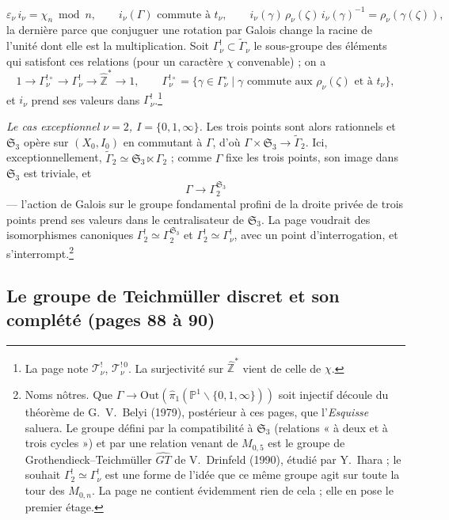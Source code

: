 \documentclass[11pt,a4paper]{article}
\begin{document}
\[
\varepsilon_{\nu}\, i_{\nu} = \chi_{n} \bmod n, \qquad
i_{\nu}(\Gamma) \text{ commute à } t_{\nu}, \qquad
i_{\nu}(\gamma)\, \rho_{\nu}(\zeta)\, i_{\nu}(\gamma)^{-1} =
\rho_{\nu}(\gamma(\zeta)) ,
\]
la dernière parce que conjuguer une rotation par Galois change la racine de
l'unité dont elle est la multiplication. Soit $\Gamma^{!}_{\nu} \subset
\widetilde{\Gamma}_{\nu}$ le sous-groupe des éléments qui satisfont ces
relations (pour un caractère $\chi$ convenable) ; on a
\[
1 \to \Gamma^{!\circ}_{\nu} \to \Gamma^{!}_{\nu} \to \widehat{\mathbb{Z}}^{*} \to 1,
\qquad
\Gamma^{!\circ}_{\nu} = \{\gamma \in \Gamma^{\circ}_{\nu} \mid \gamma \text{ commute
aux } \rho_{\nu}(\zeta) \text{ et à } t_{\nu}\},
\]
et $i_{\nu}$ prend ses valeurs dans $\Gamma^{!}_{\nu}$.\footnote{La page note
$\mathcal{T}^{!}_{\nu}$, $\mathcal{T}^{!\,0}_{\nu}$. La surjectivité sur
$\widehat{\mathbb{Z}}^{*}$ vient de celle de $\chi$.}

\emph{Le cas exceptionnel $\nu = 2$, $I = \{0, 1, \infty\}$.} Les trois points sont
alors rationnels et $\mathfrak{S}_{3}$ opère sur $(X_{0}, I_{0})$ en commutant à
$\Gamma$, d'où $\Gamma \times \mathfrak{S}_{3} \to \widetilde{\Gamma}_{2}$. Ici,
exceptionnellement, $\widetilde{\Gamma}_{2} \simeq \mathfrak{S}_{3} \ltimes
\Gamma_{2}$ ; comme $\Gamma$ fixe les trois points, son image dans
$\mathfrak{S}_{3}$ est triviale, et
\[
\boxed{\ \Gamma \longrightarrow \Gamma_{2}^{\mathfrak{S}_{3}}\ }
\]
--- l'action de Galois sur le groupe fondamental profini de la droite privée
de trois points prend ses valeurs dans le centralisateur de $\mathfrak{S}_{3}$.
La page voudrait des isomorphismes canoniques $\Gamma^{!}_{2} \simeq
\Gamma_{2}^{\mathfrak{S}_{3}}$ et $\Gamma^{!}_{2} \simeq \Gamma^{!}_{\nu}$, avec
un point d'interrogation, et s'interrompt.\footnote{Noms nôtres. Que
$\Gamma \to \mathrm{Out}(\widehat{\pi}_{1}(\mathbb{P}^{1} \smallsetminus \{0, 1,
\infty\}))$ soit injectif découle du théorème de G.~V.~Belyi (1979), postérieur
à ces pages, que l'\emph{Esquisse} saluera. Le groupe défini par la
compatibilité à $\mathfrak{S}_{3}$ (relations « à deux et à trois cycles ») et
par une relation venant de $M_{0,5}$ est le groupe de Grothendieck--Teichmüller
$\widehat{GT}$ de V.~Drinfeld (1990), étudié par Y.~Ihara ; le souhait
$\Gamma^{!}_{2} \simeq \Gamma^{!}_{\nu}$ est une forme de l'idée que ce même
groupe agit sur toute la tour des $M_{0,n}$. La page ne contient évidemment
rien de cela ; elle en pose le premier étage.}

\subsection*{Le groupe de Teichmüller discret et son complété (pages 88 à 90)}
\end{document}

